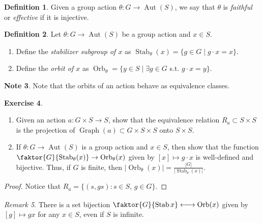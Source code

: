 \documentclass[10pt,letterpaper,cm]{nupset}
\theoremstyle{definition}
\newtheorem{definition}{Definition}[subsection]
\newtheorem{note}[definition]{Note}
\theoremstyle{theorem}
\newtheorem{exercise}[definition]{Exercise}
\theoremstyle{remark}
\newtheorem{remark}[definition]{Remark}
\newcommand{\1}{\mathbf{1}}
\newcommand{\0}{\vec 0}
\DeclareMathOperator{\graph}{Graph}
\DeclareMathOperator{\aut}{Aut}
\DeclareMathOperator{\stab}{Stab}
\DeclareMathOperator{\orb}{Orb}
\begin{document}
\begin{definition}
Given a group action $\theta: G \to \aut(S)$, we say that $\theta$ is \textit{faithful} or \textit{effective} if it is injective. 
\end{definition}

\begin{definition} Let $\theta: G \to \aut(S)$ be a group action and $x\in S$.
\begin{enumerate}
\item Define the \textit{stabilizer subgroup of $x$} as $\stab_{\theta}(x)  = \{g \in G \mid g \cdot x = x\}$. 
\item Define the \textit{orbit of $x$} as $\orb_{\theta} = \{y \in S \mid \exists g \in G$ s.t. $g \cdot x = y\}$.
\end{enumerate}
\end{definition}

\begin{note}
Note that the orbits of an action behave as equivalence classes. 
\end{note}

\begin{exercise} $ $
\begin{enumerate}
\item Given an action $a: G \times S \to S$, show that the equivalence relation $R_a \subset S \times S$ is the projection of $\graph(a) \subset G\times S \times S$ onto $S \times S$.
\item If $\theta : G \to \aut(S)$ is a group action and $x\in S$, then show that the function $\faktor{G}{\stab_{\theta}(x)} \to \orb_{\theta}(x)$ given by $[x] \mapsto g \cdot x$ is well-defined and bijective. Thus, if $G$ is finite, then $\lvert{\orb_{\theta}(x)}\rvert = \frac{ |G|}{\lvert{\stab_{\theta}(x)}\rvert}$.
\end{enumerate}
\end{exercise}

\begin{proof}
Notice that $R_a = \{(s, gs): s \in S$, $g\in G\}$.
\end{proof}

\begin{remark}{There is a set bijection $\faktor{G}{\stab{x}}  \xleftrightarrow{\phantom{med}} \orb(x)$ given by $[g] \mapsto gx$ for any $x \in S$, even if $S$ is infinite.} 
\end{remark}
\end{document}
